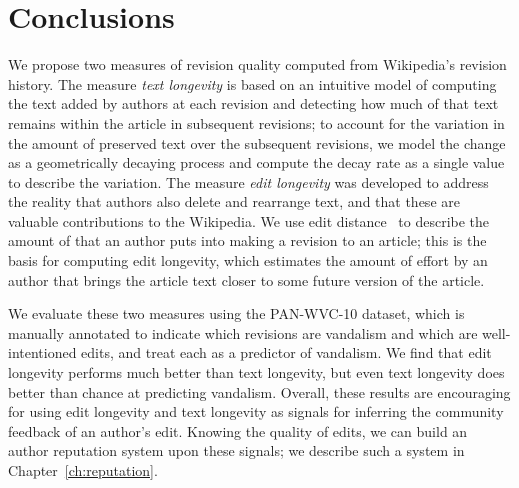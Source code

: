 \section{Conclusions}

We propose two measures of revision quality computed
from Wikipedia's revision history.
The measure \textit{text longevity} is based on an intuitive
model of computing the text added by authors at each revision
and detecting how much of that text remains within the article
in subsequent revisions; to account for the variation in
the amount of preserved text over the subsequent revisions,
we model the change as a geometrically decaying process
and compute the decay rate as a single value to describe
the variation.
The measure \textit{edit longevity} was developed to address
the reality that authors also delete and rearrange text,
and that these are valuable contributions to the Wikipedia.
We use edit distance~\cite{Levenshtein1966} to describe the
amount of  that an author puts into making a
revision to an article; this is the basis for computing
edit longevity, which estimates the amount of effort by an
author that brings the article text closer to some future
version of the article.

We evaluate these two measures using the PAN-WVC-10 dataset, which is
manually annotated to indicate which revisions are vandalism and which
are well-intentioned edits, and treat each as a predictor of vandalism.
We find that edit longevity performs much better than text longevity,
but even text longevity does better than chance at predicting vandalism.
Overall, these results are encouraging for using edit longevity and text
longevity as signals for inferring the community feedback of an author's
edit.  Knowing the quality of edits, we can build an author reputation
system upon these signals; we describe such a system in
Chapter~\ref{ch:reputation}.

